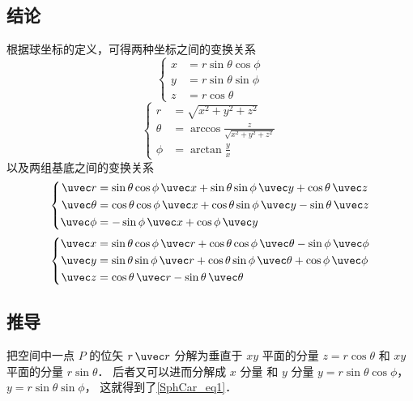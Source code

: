 
\subsection{结论}
根据球坐标的定义，可得两种坐标之间的变换关系
\begin{equation}\label{SphCar_eq1}
\left\{ \begin{aligned}
x &= r\sin \theta \cos \phi \\
y &= r\sin \theta \sin \phi \\
z &= r\cos \theta 
\end{aligned} \right.
\end{equation}
\begin{equation}\label{SphCar_eq2}
\left\{ \begin{aligned}
r &= \sqrt {x^2 + y^2 + z^2} \\
\theta  &= \arccos \frac{z}{\sqrt {{x^2} + {y^2} + {z^2}} }\\
\phi  &= \arctan \frac{y}{x}
\end{aligned} \right.
\end{equation}
以及两组基底之间的变换关系
\begin{equation}\label{SphCar_eq3}
\left\{ \begin{aligned}
\uvec r &= \sin\theta\cos\phi\,\uvec x + \sin\theta\sin\phi\,\uvec y + \cos\theta\,\uvec z\\
\uvec \theta  &= \cos\theta\cos\phi\,\uvec x + \cos\theta\sin\phi\,\uvec y - \sin\theta\,\uvec z\\
\uvec \phi  &=  - \sin\phi\,\uvec x + \cos\phi\,\uvec y
\end{aligned} \right.
\end{equation}
\begin{equation}\label{SphCar_eq4}
\left\{ \begin{aligned}
\uvec x &= \sin \theta \cos \phi \,\uvec r + \cos \theta \cos \phi \,\uvec \theta  - \sin \phi \,\uvec \phi \\
\uvec y &= \sin \theta \sin \phi \,\uvec r + \cos \theta \sin \phi \,\uvec \theta  + \cos \phi \,\uvec \phi \\
\uvec z &= \cos \theta \,\uvec r - \sin \theta \,\uvec \theta 
\end{aligned} \right.
\end{equation}
\subsection{推导}
把空间中一点 $P$ 的位矢 $r \,\uvec r$ 分解为垂直于 $xy$ 平面的分量 $z = r\cos \theta $ 和 $xy$ 平面的分量 $r\sin \theta $． 后者又可以进而分解成 $x$ 分量 和 $y$ 分量  $y = r\sin \theta \cos \phi$，  $y = r\sin \theta \sin \phi$， 这就得到了\autoref{SphCar_eq1}．

